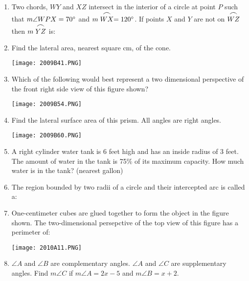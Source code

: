 \documentclass[../uilmath.tex]{subfiles}
\begin{document}
\begin{enumerate}[label=\bfseries\arabic*.]
    \item %
    Two chords, $WY$ and $XZ$ intersect in the interior of a circle at point $P$ such that 
    $m\angle WPX=70\degree$ and $m\stackrel{\mbox{\large$\frown$}}{WX}=120\degree$. If points $X$ and $Y$ are not on $\stackrel{\mbox{\large$\frown$}}{WZ}$ then $m\stackrel{\mbox{\large$\frown$}}{YZ}$ is:

    \item %
    Find the lateral area, nearest square cm, of the cone.
    \begin{center}
        \texttt{[image: 2009B41.PNG]}
    \end{center}

    \item %
    Which of the following would best represent a two dimensional perspective of the front right side view of this figure shown?
    \begin{center}
        \texttt{[image: 2009B54.PNG]}
    \end{center}

    \item %
    Find the lateral surface area of this prism. All angles are right angles.
    \begin{center}
        \texttt{[image: 2009B60.PNG]}
    \end{center}

    \item %
    A right cylinder water tank is 6 feet high and has an inside radius of 3 feet. The amount of water 
    in the tank is 75\% of its maximum capacity. How much water is in the tank? (nearest gallon)

    \item %
    The region bounded by two radii of a circle and their intercepted arc is called a:

    \item %
    One-centimeter cubes are glued together to form the object in the figure shown. The two-dimensional persepctive of the top view 
    of this figure has a perimeter of: 
    \begin{center}
        \texttt{[image: 2010A11.PNG]}
    \end{center}

    \item %
    $\angle A$ and $\angle B$ are complementary angles. $\angle A$ and $\angle C$ are supplementary angles.
    Find $m\angle C$ if $m\angle A=2x-5$ and $m\angle B=x+2$.


\end{enumerate}
\end{document}
